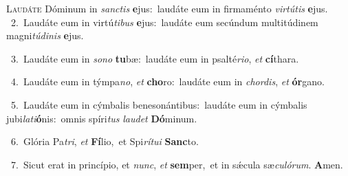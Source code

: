 \lettrine{\initial\textcolor{\initialcolor}{L}}{audáte} Dóminum in \textit{sanc}\-\textit{tis} \textbf{e}\-jus:~\star laudáte eum in firmaménto \textit{vir}\-\textit{tú}\textit{tis} \textbf{e}\-jus.\\
{\numbfont\textcolor{\numbcolor}{~2.}}~Laudáte eum in virtú\-\textit{ti}\-\textit{bus} \textbf{e}\-jus:~\star laudáte eum secúndum multitúdinem magni\-\textit{tú}\-\textit{di}\textit{nis} \textbf{e}\-jus.\par
{\numbfont\textcolor{\numbcolor}{~3.}}~Laudáte eum in \textit{so}\-\textit{no} \textbf{tu}\-bæ:~\star laudáte eum in psalté\-\textit{ri}\-\textit{o}, \textit{et} \textbf{cí}\-thara.\par
{\numbfont\textcolor{\numbcolor}{~4.}}~Laudáte eum in týmpa\-\textit{no}\-, \textit{et} \textbf{cho}\-ro:~\star laudáte eum in \textit{chor}\-\textit{dis}, \textit{et} \textbf{ór}\-gano.\par
{\numbfont\textcolor{\numbcolor}{~5.}}~Laudáte eum in cýmbalis benesonántibus:~\dagger laudáte eum in cýmbalis jubi\-\textit{la}\-\textit{ti}\textbf{ó}nis:~\star omnis spíri\textit{tus} \textit{lau}\-\textit{det} \textbf{Dó}\-minum.\par
{\numbfont\textcolor{\numbcolor}{~6.}}~Glória Pa\-\textit{tri}\-, \textit{et} \textbf{Fí}\-lio,~\star et Spi\-\textit{rí}\-\textit{tu}\textit{i} \textbf{Sanc}\-to.\par
{\numbfont\textcolor{\numbcolor}{~7.}}~Sicut erat in princípio, et \textit{nunc}\-, \textit{et} \textbf{sem}\-per,~\star et in sǽcula sæ\-\textit{cu}\-\textit{ló}\textit{rum}. \textbf{A}\-men.\par
